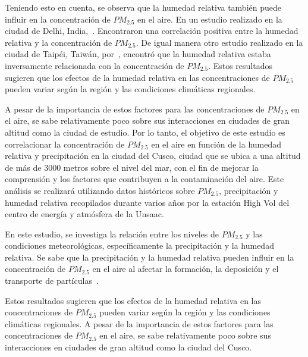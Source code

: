 \documentclass[a4paper,11pt]{article}
\begin{document}
Teniendo esto en cuenta, se observa que la humedad relativa también puede influir en la concentración de $PM_{2.5}$ en el aire. En un estudio realizado en la ciudad de Delhi, India,~\cite{Praveen_2018}. Encontraron una correlación positiva entre la humedad relativa y la concentración de $PM_{2.5}$. De igual manera otro estudio realizado en la ciudad de Taipéi, Taiwán, por~\cite{Yang_2020}, encontró que la humedad relativa estaba inversamente relacionada con la concentración de $PM_{2.5}$. Estos resultados sugieren que los efectos de la humedad relativa en las concentraciones de $PM_{2.5}$ pueden variar según la región y las condiciones climáticas regionales.

A pesar de la importancia de estos factores para las concentraciones de $PM_{2.5}$ en el aire, se sabe relativamente poco sobre sus interacciones en ciudades de gran altitud como la ciudad de estudio. Por lo tanto, el objetivo de este estudio es correlacionar la concentración de $PM_{2.5}$ en el aire en función de la humedad relativa y precipitación en la ciudad del Cusco, ciudad que se ubica a una altitud de más de 3000 metros sobre el nivel del mar, con el fin de mejorar la comprensión y los factores que contribuyen a la contaminación del aire. Este análisis se realizará utilizando datos históricos sobre $PM_{2.5}$, precipitación y humedad relativa recopilados durante varios años por la estación High Vol del centro de energía y atmósfera de la Unsaac.

En este estudio, se investiga la relación entre los niveles de $PM_{2.5}$ y las condiciones meteorológicas, específicamente la precipitación y la humedad relativa. Se sabe que la precipitación y la humedad relativa pueden influir en la concentración de $PM_{2.5}$ en el aire al afectar la formación, la deposición y el transporte de partículas~\cite{Li_Li_Li_Li_Liu_Bai_2020}.

Estos resultados sugieren que los efectos de la humedad relativa en las concentraciones de $PM_{2.5}$ pueden variar según la región y las condiciones climáticas regionales. A pesar de la importancia de estos factores para las concentraciones de $PM_{2.5}$ en el aire, se sabe relativamente poco sobre sus interacciones en ciudades de gran altitud como la ciudad del Cusco.
\end{document}
